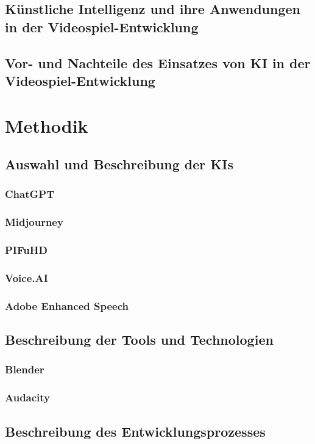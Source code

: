 \documentclass[12pt,a4paper,bibliography=totocnumbered,listof=totocnumbered]{scrartcl}
\begin{document}
\subsection{Künstliche Intelligenz und ihre Anwendungen in der Videospiel-Entwicklung}
\subsection{Vor- und Nachteile des Einsatzes von KI in der Videospiel-Entwicklung}

\section{Methodik}
\subsection{Auswahl und Beschreibung der KIs}
\subsubsection{ChatGPT}
\subsubsection{Midjourney}
\subsubsection{PIFuHD}
\subsubsection{Voice.AI}
\subsubsection{Adobe Enhanced Speech}

\subsection{Beschreibung der Tools und Technologien}
\subsubsection{Blender}
\subsubsection{Audacity}

\subsection{Beschreibung des Entwicklungsprozesses}
\end{document}
